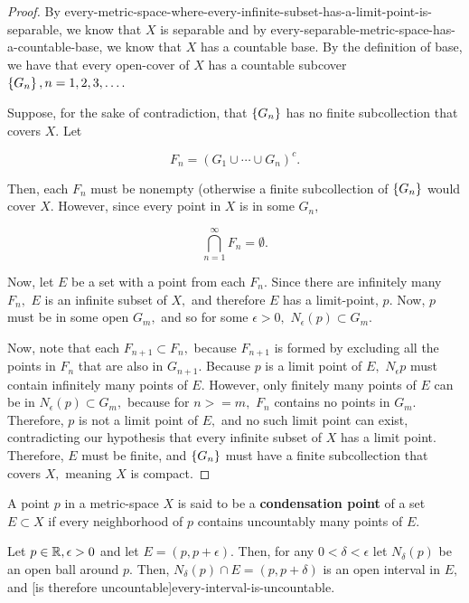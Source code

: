 \documentclass{article}
\begin{document}
\begin{proof}
By \@{every-metric-space-where-every-infinite-subset-has-a-limit-point-is-separable}, we know that $X$ is separable and by \@{every-separable-metric-space-has-a-countable-base}, we know that $X$ has a countable base. By the definition of \@{base}, we have that every \@{open-cover} of $X$ has a \@{countable} subcover $\left\{ G_n \right\}, n = 1, 2, 3, \dots.$

Suppose, for the sake of contradiction, that $\left\{ G_n \right\}$ has no finite subcollection that covers $X.$ Let

\[ F_n = (G_1 \cup \cdots \cup G_n)^c. \]

Then, each $F_n$ must be nonempty (otherwise a finite subcollection of $\left\{ G_n \right\}$ would cover $X.$ However, since every point in $X$ is in some $G_n,$

\[ \bigcap_{n=1}^{\infty} F_n = \emptyset. \]

Now, let $E$ be a set with a point from each $F_n.$ Since there are infinitely many $F_n,$ $E$ is an \@{infinite} subset of $X,$ and therefore $E$ has a \@{limit-point}, $p.$ Now, $p$ must be in some open $G_m,$ and so for some $\epsilon > 0,$ $N_{\epsilon}(p) \subset G_m.$

Now, note that each $F_{n+1} \subset F_n,$ because $F_{n+1}$ is formed by excluding all the points in $F_n$ that are also in $G_{n+1}.$ Because $p$ is a limit point of $E,$ $N_\epsilon{p}$ must contain infinitely many points of $E.$ However, only finitely many points of $E$ can be in $N_{\epsilon}(p) \subset G_m,$ because for $n >= m,$ $F_n$ contains no points in $G_m.$ Therefore, $p$ is not a limit point of $E,$ and no such limit point can exist, contradicting our hypothesis that every infinite subset of $X$ has a limit point. Therefore, $E$ must be finite, and $\left\{ G_n \right\}$ must have a finite subcollection that covers $X,$ meaning $X$ is \@{compact}.
\end{proof}

\begin{definition}
A point $p$ in a \@{metric-space} $X$ is said to be a \textbf{condensation point} of a set $E \subset X$ if every \@{neighborhood} of $p$ contains uncountably many points of $E.$
\end{definition}

\begin{example}\label{condensation-point-example}
Let $p \in \mathbb{R}, \epsilon > 0$ and let $E = (p, p+\epsilon).$ Then, for any $0 < \delta < \epsilon$ let $N_{\delta}(p)$ be an open \@{ball} around $p.$ Then, $N_{\delta}(p) \cap E = (p, p + \delta)$ is an open interval in $E,$ and \@[is therefore uncountable]{every-interval-is-uncountable}.
\end{example}
\end{document}
